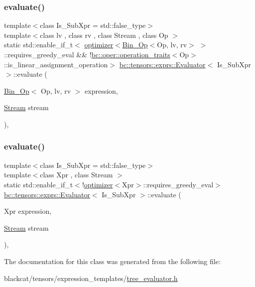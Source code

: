 \subsubsection{\texorpdfstring{evaluate()}{evaluate()}\hspace{0.1cm}{\footnotesize\ttfamily [3/4]}}
{\footnotesize\ttfamily template$<$class Is\+\_\+\+Sub\+Xpr  = std\+::false\+\_\+type$>$ \\
template$<$class lv , class rv , class Stream , class Op $>$ \\
static std\+::enable\+\_\+if\+\_\+t$<$ \hyperlink{structbc_1_1tensors_1_1exprs_1_1optimizer}{optimizer}$<$\hyperlink{structbc_1_1tensors_1_1exprs_1_1Bin__Op}{Bin\+\_\+\+Op}$<$Op, lv, rv$>$ $>$\+::requires\+\_\+greedy\+\_\+eval \&\& !\hyperlink{structbc_1_1oper_1_1operation__traits}{bc\+::oper\+::operation\+\_\+traits}$<$Op$>$\+::is\+\_\+linear\+\_\+assignment\+\_\+operation$>$ \hyperlink{classbc_1_1tensors_1_1exprs_1_1Evaluator}{bc\+::tensors\+::exprs\+::\+Evaluator}$<$ Is\+\_\+\+Sub\+Xpr $>$\+::evaluate (\begin{DoxyParamCaption}\item[{\hyperlink{structbc_1_1tensors_1_1exprs_1_1Bin__Op}{Bin\+\_\+\+Op}$<$ Op, lv, rv $>$}]{expression,  }\item[{\hyperlink{classbc_1_1streams_1_1Stream}{Stream}}]{stream }\end{DoxyParamCaption})\hspace{0.3cm}{\ttfamily [inline]}, {\ttfamily [static]}}

\mbox{\label{classbc_1_1tensors_1_1exprs_1_1Evaluator_aff9a73b45c8d614326f1675e86970312}} 
\subsubsection{\texorpdfstring{evaluate()}{evaluate()}\hspace{0.1cm}{\footnotesize\ttfamily [4/4]}}
{\footnotesize\ttfamily template$<$class Is\+\_\+\+Sub\+Xpr  = std\+::false\+\_\+type$>$ \\
template$<$class Xpr , class Stream $>$ \\
static std\+::enable\+\_\+if\+\_\+t$<$!\hyperlink{structbc_1_1tensors_1_1exprs_1_1optimizer}{optimizer}$<$Xpr$>$\+::requires\+\_\+greedy\+\_\+eval$>$ \hyperlink{classbc_1_1tensors_1_1exprs_1_1Evaluator}{bc\+::tensors\+::exprs\+::\+Evaluator}$<$ Is\+\_\+\+Sub\+Xpr $>$\+::evaluate (\begin{DoxyParamCaption}\item[{Xpr}]{expression,  }\item[{\hyperlink{classbc_1_1streams_1_1Stream}{Stream}}]{stream }\end{DoxyParamCaption})\hspace{0.3cm}{\ttfamily [inline]}, {\ttfamily [static]}}



The documentation for this class was generated from the following file\+:\begin{DoxyCompactItemize}
\item 
blackcat/tensors/expression\+\_\+templates/\hyperlink{tree__evaluator_8h}{tree\+\_\+evaluator.\+h}\end{DoxyCompactItemize}
